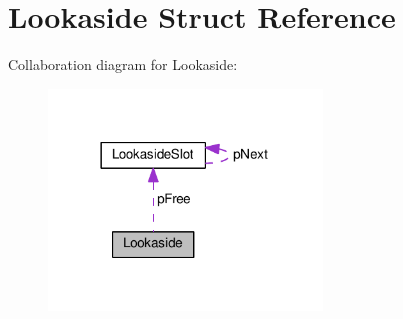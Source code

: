 \hypertarget{structLookaside}{}\section{Lookaside Struct Reference}
\label{structLookaside}


Collaboration diagram for Lookaside\+:\nopagebreak
\begin{figure}[H]
\begin{center}
\leavevmode
\includegraphics[width=206pt]{structLookaside__coll__graph}
\end{center}
\end{figure}

